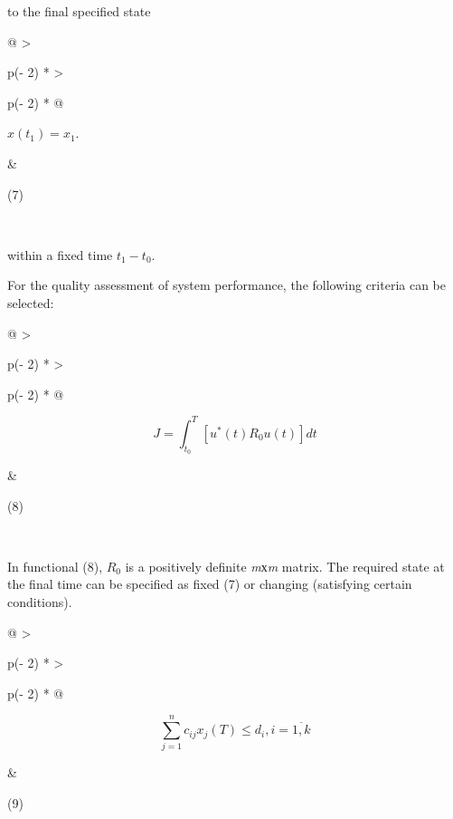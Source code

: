 to the final specified state

\begin{longtable}[]{@{}
  >{\raggedright\arraybackslash}p{(\columnwidth - 2\tabcolsep) * }
  >{\raggedright\arraybackslash}p{(\columnwidth - 2\tabcolsep) * }@{}}
\toprule\noalign{}
\begin{minipage}[b]{\linewidth}\raggedright
\(x\left( t_{1} \right) = x_{1}\).
\end{minipage} & \begin{minipage}[b]{\linewidth}\raggedright
(7)
\end{minipage} \\
\midrule\noalign{}
\endhead
\bottomrule\noalign{}
\endlastfoot
\end{longtable}

within a fixed time \(t_{1} - t_{0}\).

For the quality assessment of system performance, the following criteria
can be selected:

\begin{longtable}[]{@{}
  >{\raggedright\arraybackslash}p{(\columnwidth - 2\tabcolsep) * }
  >{\raggedright\arraybackslash}p{(\columnwidth - 2\tabcolsep) * }@{}}
\toprule\noalign{}
\begin{minipage}[b]{\linewidth}\raggedright
\[J = \int_{t_{0}}^{T}{\left\lbrack u^{*}(t)R_{0}u(t) \right\rbrack dt}\]
\end{minipage} & \begin{minipage}[b]{\linewidth}\raggedright
(8)
\end{minipage} \\
\midrule\noalign{}
\endhead
\bottomrule\noalign{}
\endlastfoot
\end{longtable}

In functional (8), \(R_{0}\) is a positively definite \emph{m}х\emph{m}
matrix. The required state at the final time can be specified as fixed
(7) or changing (satisfying certain conditions).

\begin{longtable}[]{@{}
  >{\raggedright\arraybackslash}p{(\columnwidth - 2\tabcolsep) * }
  >{\raggedright\arraybackslash}p{(\columnwidth - 2\tabcolsep) * }@{}}
\toprule\noalign{}
\begin{minipage}[b]{\linewidth}\raggedright
\[\sum_{j = 1}^{n}c_{ij}x_{j}(T) \leq d_{i},i = \overline{1,k}\]
\end{minipage} & \begin{minipage}[b]{\linewidth}\raggedright
(9)
\end{minipage} \\
\midrule\noalign{}
\endhead
\bottomrule\noalign{}
\endlastfoot
\end{longtable}

